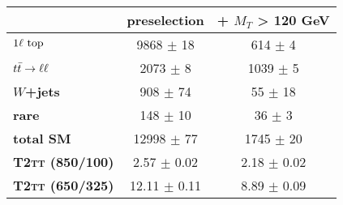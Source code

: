     \begin{tabular}{|l|cc|}
        \hline
        &
        \textbf{preselection}   &
        \textbf{ + $M_{T}$ > 120 GeV}                                 \\
        \hline
        \textbf{$1\ell~\text{top}$} & 9868  $\pm$ 18    & 614 $\pm$ 4     \\
        \textbf{$t\bar{t} \rightarrow \ell \ell$}  & 2073  $\pm$ 8     & 1039 $\pm$ 5    \\
        \textbf{$W$+jets}        & 908   $\pm$ 74    & 55 $\pm$ 18     \\
        \textbf{rare}            & 148   $\pm$ 10    & 36 $\pm$ 3      \\
        \hline
        \textbf{total SM}        & 12998 $\pm$ 77    & 1745 $\pm$ 20   \\
        \hline
        \textbf{\textsc{T2tt} (850/100)}  & 2.57  $\pm$ 0.02  & 2.18 $\pm$ 0.02 \\
        \textbf{\textsc{T2tt} (650/325)}  & 12.11 $\pm$ 0.11  & 8.89 $\pm$ 0.09 \\
        \hline
    \end{tabular}
